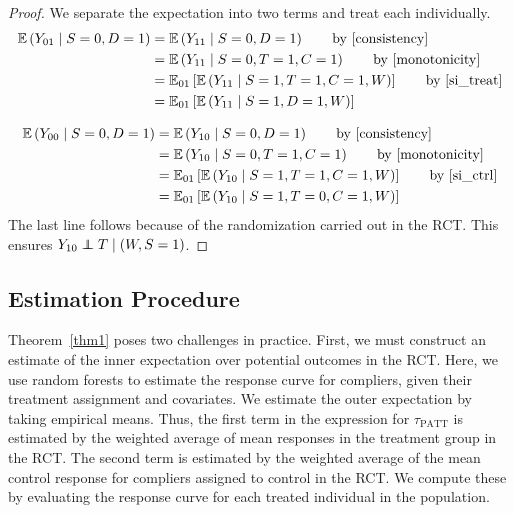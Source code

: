 \documentclass[12pt]{article}
\newcommand{\ex}{\mathbb{E}} %
\newcommand\independent{\protect\mathpalette{\protect\independenT}{\perp}}
\def\independenT#1#2{\mathrel{\rlap{$#1#2$}\mkern2mu{#1#2}}}
\begin{document}
\begin{proof}
We separate the expectation into two terms and treat each individually.
\begin{align*}
\ex\left(Y_{01} \mid S=0,D=1\right) &= \ex\left(Y_{11} \mid S=0, D=1\right) \tag*{by \eqref{consistency}} \\
&= \ex\left(Y_{11} \mid S=0, T=1, C=1\right) \tag*{by \eqref{monotonicity}} \\
&= \ex_{01}\left[  \ex\left(Y_{11} \mid S=1, T=1, C=1, W\right) \right] \tag*{by \eqref{si_treat}} \\
&= \ex_{01}\left[  \ex\left(Y_{11} \mid S=1, D=1, W\right)\right]
\end{align*}


\begin{align*}
\ex\left(Y_{00} \mid S=0, D=1\right) &= \ex\left(Y_{10} \mid S=0, D=1\right) \tag*{by \eqref{consistency}} \\
&= \ex\left(Y_{10} \mid S=0, T=1, C=1\right) \tag*{by \eqref{monotonicity}} \\
&= \ex_{01}\left[  \ex\left(Y_{10} \mid S=1, T=1, C=1, W\right) \right] \tag*{by \eqref{si_ctrl}} \\
&= \ex_{01}\left[  \ex\left(Y_{10} \mid S=1, T=0, C=1, W\right) \right] \\
\end{align*}
The last line follows because of the randomization carried out in the RCT.  This ensures $Y_{10} \independent T \mid (W, S=1)$.
\end{proof}

\subsection{Estimation Procedure}
Theorem~\ref{thm1} poses two challenges in practice.  First, we must construct an estimate of the inner expectation over potential outcomes in the RCT.  Here, we use random forests to estimate the response curve for compliers, given their treatment assignment and covariates. We estimate the outer expectation by taking empirical means.  Thus, the first term in the expression for $\tau_{\text{PATT}}$ is estimated by the weighted average of mean responses in the treatment group in the RCT. The second term is estimated by the weighted average of the mean control response for compliers assigned to control in the RCT.  We compute these by evaluating the response curve for each treated individual in the population.  \\
\end{document}
